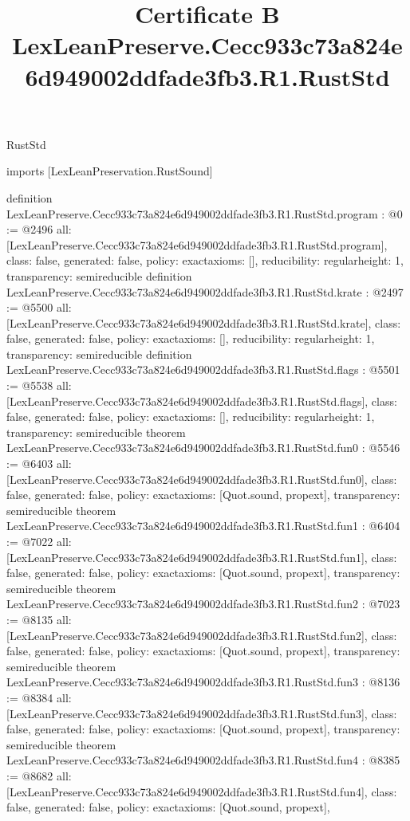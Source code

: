 \begin{lexlean}{RustStd}
\title{Certificate B LexLeanPreserve.Cecc933c73a824e6d949002ddfade3fb3.R1.RustStd}
\begin{coremodule}
imports [LexLeanPreservation.RustSound]

definition LexLeanPreserve.Cecc933c73a824e6d949002ddfade3fb3.R1.RustStd.program : @0 := @2496 {
  all: [LexLeanPreserve.Cecc933c73a824e6d949002ddfade3fb3.R1.RustStd.program],
  class: false,
  generated: false,
  policy: exact{axioms: []},
  reducibility: regular{height: 1},
  transparency: semireducible
}
definition LexLeanPreserve.Cecc933c73a824e6d949002ddfade3fb3.R1.RustStd.krate : @2497 := @5500 {
  all: [LexLeanPreserve.Cecc933c73a824e6d949002ddfade3fb3.R1.RustStd.krate],
  class: false,
  generated: false,
  policy: exact{axioms: []},
  reducibility: regular{height: 1},
  transparency: semireducible
}
definition LexLeanPreserve.Cecc933c73a824e6d949002ddfade3fb3.R1.RustStd.flags : @5501 := @5538 {
  all: [LexLeanPreserve.Cecc933c73a824e6d949002ddfade3fb3.R1.RustStd.flags],
  class: false,
  generated: false,
  policy: exact{axioms: []},
  reducibility: regular{height: 1},
  transparency: semireducible
}
theorem LexLeanPreserve.Cecc933c73a824e6d949002ddfade3fb3.R1.RustStd.fun0 : @5546 := @6403 {
  all: [LexLeanPreserve.Cecc933c73a824e6d949002ddfade3fb3.R1.RustStd.fun0],
  class: false,
  generated: false,
  policy: exact{axioms: [Quot.sound, propext]},
  transparency: semireducible
}
theorem LexLeanPreserve.Cecc933c73a824e6d949002ddfade3fb3.R1.RustStd.fun1 : @6404 := @7022 {
  all: [LexLeanPreserve.Cecc933c73a824e6d949002ddfade3fb3.R1.RustStd.fun1],
  class: false,
  generated: false,
  policy: exact{axioms: [Quot.sound, propext]},
  transparency: semireducible
}
theorem LexLeanPreserve.Cecc933c73a824e6d949002ddfade3fb3.R1.RustStd.fun2 : @7023 := @8135 {
  all: [LexLeanPreserve.Cecc933c73a824e6d949002ddfade3fb3.R1.RustStd.fun2],
  class: false,
  generated: false,
  policy: exact{axioms: [Quot.sound, propext]},
  transparency: semireducible
}
theorem LexLeanPreserve.Cecc933c73a824e6d949002ddfade3fb3.R1.RustStd.fun3 : @8136 := @8384 {
  all: [LexLeanPreserve.Cecc933c73a824e6d949002ddfade3fb3.R1.RustStd.fun3],
  class: false,
  generated: false,
  policy: exact{axioms: [Quot.sound, propext]},
  transparency: semireducible
}
theorem LexLeanPreserve.Cecc933c73a824e6d949002ddfade3fb3.R1.RustStd.fun4 : @8385 := @8682 {
  all: [LexLeanPreserve.Cecc933c73a824e6d949002ddfade3fb3.R1.RustStd.fun4],
  class: false,
  generated: false,
  policy: exact{axioms: [Quot.sound, propext]},
}
\end{coremodule}
\end{lexlean}
